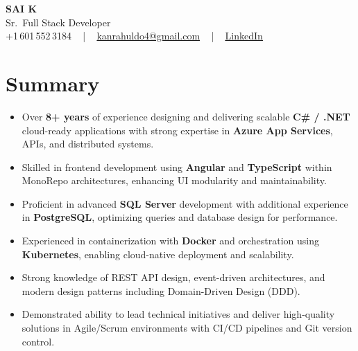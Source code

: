 \documentclass[letterpaper,11pt]{article}
\newcommand{\resumeItem}[1]{
  \item\footnotesize{
    {#1 \vspace{-2pt}}
  }
}
\newcommand{\resumeItemListStart}{\begin{itemize}[leftmargin=*]}
\newcommand{\resumeItemListEnd}{\end{itemize}\vspace{-5pt}}
\begin{document}
\begin{center}
    {\fontsize{14pt}{12pt}\selectfont \textbf{\MakeUppercase{Sai K}}}\\ \vspace{2pt}
    \fontsize{10pt}{12pt}\selectfont Sr.\ Full Stack Developer\\ \vspace{2pt}
    \fontsize{10pt}{12pt}\selectfont +1\,601\,552\,3184 ~ | ~
    \href{mailto:kanrahuldo4@gmail.com}{kanrahuldo4@gmail.com} ~ | ~
    \href{https://www.linkedin.com/in/srrrk/}{\color{blue}\underline{LinkedIn}}
    \vspace{-10pt}
\end{center}

\section{Summary}
\fontsize{9pt}{10pt}\selectfont
\resumeItemListStart
  \resumeItem{Over \textbf{8+ years} of experience designing and delivering scalable \textbf{C\# / .NET} cloud-ready applications with strong expertise in \textbf{Azure App Services}, APIs, and distributed systems.}
  \resumeItem{Skilled in frontend development using \textbf{Angular} and \textbf{TypeScript} within MonoRepo architectures, enhancing UI modularity and maintainability.}
  \resumeItem{Proficient in advanced \textbf{SQL Server} development with additional experience in \textbf{PostgreSQL}, optimizing queries and database design for performance.}
  \resumeItem{Experienced in containerization with \textbf{Docker} and orchestration using \textbf{Kubernetes}, enabling cloud-native deployment and scalability.}
  \resumeItem{Strong knowledge of REST API design, event-driven architectures, and modern design patterns including Domain-Driven Design (DDD).}
  \resumeItem{Demonstrated ability to lead technical initiatives and deliver high-quality solutions in Agile/Scrum environments with CI/CD pipelines and Git version control.}
\resumeItemListEnd
\vspace{-6pt}

\end{document}
